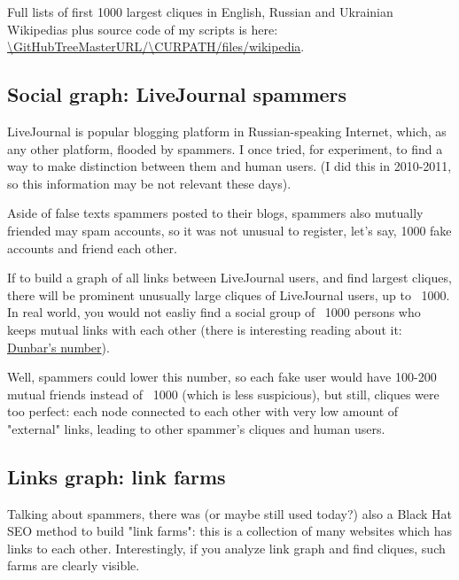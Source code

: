 Full lists of first 1000 largest cliques in English, Russian and Ukrainian Wikipedias plus source code of my scripts is here:
\url{\GitHubTreeMasterURL/\CURPATH/files/wikipedia}.

\subsection{Social graph: LiveJournal spammers}

LiveJournal is popular blogging platform in Russian-speaking Internet, which, as any other platform, flooded by spammers.
I once tried, for experiment, to find a way to make distinction between them and human users.
(I did this in 2010-2011, so this information may be not relevant these days).

Aside of false texts spammers posted to their blogs, spammers also mutually friended may spam accounts, so it was not unusual to register, let's say, 1000 fake
accounts and friend each other.

If to build a graph of all links between LiveJournal users, and find largest cliques, there will be prominent unusually large cliques of LiveJournal users, 
up to ~1000.
In real world, you would not easliy find a social group of ~1000 persons who keeps mutual links with each other 
(there is interesting reading about it: \href{https://en.wikipedia.org/w/index.php?title=Dunbar%27s_number}{Dunbar's number}).

Well, spammers could lower this number, so each fake user would have 100-200 mutual friends instead of ~1000 (which is less suspicious), but still, 
cliques were too perfect: each node connected to each other with very low
amount of "external" links, leading to other spammer's cliques and human users.

\subsection{Links graph: link farms}

Talking about spammers, there was (or maybe still used today?) also a Black Hat SEO method to build 
"link farms":
this is a collection of many websites which has links to each other.
Interestingly, if you analyze link graph and find cliques, such farms are clearly visible.

